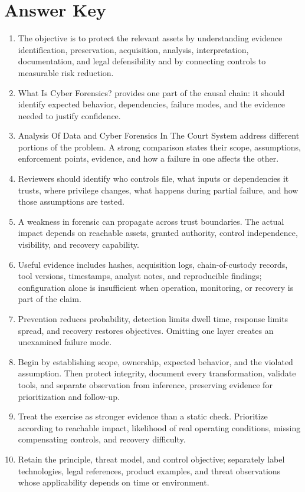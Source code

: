 \documentclass[11pt]{article}
\begin{document}
\section*{Answer Key}
\begin{enumerate}
\item The objective is to protect the relevant assets by understanding evidence identification, preservation, acquisition, analysis, interpretation, documentation, and legal defensibility and by connecting controls to measurable risk reduction.
\item What Is Cyber Forensics? provides one part of the causal chain: it should identify expected behavior, dependencies, failure modes, and the evidence needed to justify confidence.
\item Analysis Of Data and Cyber Forensics In The Court System address different portions of the problem. A strong comparison states their scope, assumptions, enforcement points, evidence, and how a failure in one affects the other.
\item Reviewers should identify who controls file, what inputs or dependencies it trusts, where privilege changes, what happens during partial failure, and how those assumptions are tested.
\item A weakness in forensic can propagate across trust boundaries. The actual impact depends on reachable assets, granted authority, control independence, visibility, and recovery capability.
\item Useful evidence includes hashes, acquisition logs, chain-of-custody records, tool versions, timestamps, analyst notes, and reproducible findings; configuration alone is insufficient when operation, monitoring, or recovery is part of the claim.
\item Prevention reduces probability, detection limits dwell time, response limits spread, and recovery restores objectives. Omitting one layer creates an unexamined failure mode.
\item Begin by establishing scope, ownership, expected behavior, and the violated assumption. Then protect integrity, document every transformation, validate tools, and separate observation from inference, preserving evidence for prioritization and follow-up.
\item Treat the exercise as stronger evidence than a static check. Prioritize according to reachable impact, likelihood of real operating conditions, missing compensating controls, and recovery difficulty.
\item Retain the principle, threat model, and control objective; separately label technologies, legal references, product examples, and threat observations whose applicability depends on time or environment.
\end{enumerate}
\end{document}
